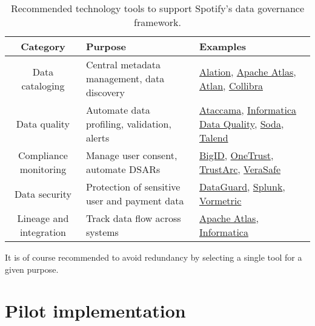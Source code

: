 \documentclass[11pt,a4paper,computermodern]{article}
\begin{document}
\begin{table}[h]
	\centering
	\begin{threeparttable}
		\caption{Recommended technology tools to support Spotify's data governance framework.}
		\label{table:tools}
		\begin{tabularx}{0.99\textwidth}{c >{\centering\arraybackslash}X >{\centering\arraybackslash}X}
			\toprule
			Category & Purpose & Examples \\
			\midrule
			Data cataloging & Central metadata management, data discovery & \href{https://www.alation.com/}{Alation}, \href{https://atlas.apache.org/}{Apache Atlas}, \href{https://atlan.com/}{Atlan}, \href{https://www.collibra.com/}{Collibra} \\
			Data quality & Automate data profiling, validation, alerts & \href{https://www.ataccama.com/}{Ataccama}, \href{https://www.informatica.com/products/data-quality.html}{Informatica Data Quality}, \href{https://www.soda.io/}{Soda}, \href{https://www.talend.com/products/data-integrity-governance/}{Talend} \\
			Compliance monitoring & Manage user consent, automate DSARs & \href{https://bigid.com/}{BigID}, \href{https://www.onetrust.com/}{OneTrust}, \href{https://trustarc.com/}{TrustArc}, \href{https://verasafe.com/}{VeraSafe} \\
			Data security & Protection of sensitive user and payment data & \href{https://www.dataguard.com/}{DataGuard}, \href{https://www.splunk.com/}{Splunk}, \href{https://cpl.thalesgroup.com/encryption/vormetric-data-security-platform}{Vormetric} \\
			Lineage and integration & Track data flow across systems & \href{https://atlas.apache.org/}{Apache Atlas}, \href{https://www.informatica.com/products/data-quality.html}{Informatica} \\
			\bottomrule
		\end{tabularx}
	\end{threeparttable}
\end{table}

It is of course recommended to avoid redundancy by selecting a single tool for a given purpose.


\section*{Pilot implementation}
\end{document}
